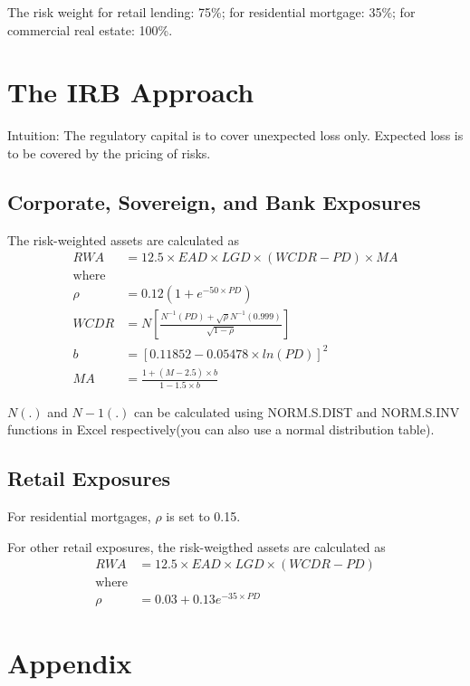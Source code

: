 \documentclass[12pt]{article} 
\begin{document}
The risk weight for retail lending: 75\%; for residential mortgage: 35\%; for
commercial real estate: 100\%.

\section*{The IRB Approach}

Intuition: The regulatory capital is to cover unexpected loss only. Expected
loss is to be covered by the pricing of risks.

\subsection*{Corporate, Sovereign, and Bank Exposures}

The risk-weighted assets are calculated as
\begin{align*}
  RWA & = 12.5 \times EAD \times LGD \times (WCDR - PD) \times MA \\
  \textrm{where} \\
  \rho & = 0.12(1 + e^{-50 \times PD}) \\
  WCDR & = N[\frac{ N^{-1} (PD) +\sqrt{\rho} N^{-1} (0.999) }{ \sqrt{ 1 - \rho } }] \\
  b & = [0.11852 - 0.05478 \times ln(PD)]^{2} \\
  MA & = \frac{ 1 + (M-2.5) \times b }{ 1 - 1.5 \times b }
\end{align*}

\(N(.)\) and \(N-1(.)\) can be calculated using NORM.S.DIST and NORM.S.INV
functions in Excel respectively(you can also use a normal distribution table).

\subsection*{Retail Exposures}

For residential mortgages, \(\rho\) is set to 0.15.

For other retail exposures, the risk-weigthed assets are calculated as
\begin{align*}
  RWA & = 12.5 \times EAD \times LGD \times (WCDR - PD) \\
  \textrm{where} \\
  \rho & = 0.03 + 0.13 e^{-35 \times PD}
\end{align*}

\newpage
\appendix
\section*{Appendix}
\end{document}
